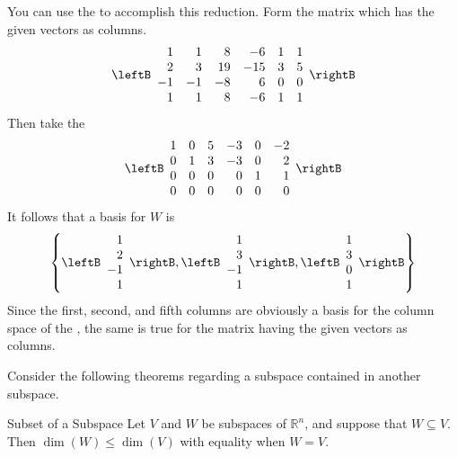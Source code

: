 \begin{solution}
You can use the \rref\; to accomplish this reduction. Form
the matrix which has the given vectors as columns. 
\begin{equation*}
\leftB
\begin{array}{rrrrrr}
1 & 1 & 8 & -6 & 1 & 1 \\ 
2 & 3 & 19 & -15 & 3 & 5 \\ 
-1 & -1 & -8 & 6 & 0 & 0 \\ 
1 & 1 & 8 & -6 & 1 & 1
\end{array}
\rightB
\end{equation*}
Then take the \rref\; 
\begin{equation*}
\leftB
\begin{array}{rrrrrr}
1 & 0 & 5 & -3 & 0 & -2 \\ 
0 & 1 & 3 & -3 & 0 & 2 \\ 
0 & 0 & 0 & 0 & 1 & 1 \\ 
0 & 0 & 0 & 0 & 0 & 0
\end{array}
\rightB
\end{equation*}
It follows that a basis for $W$ is 
\begin{equation*}
\left\{ \leftB 
\begin{array}{r}
1 \\ 
2 \\ 
-1 \\ 
1
\end{array}
\rightB ,\leftB 
\begin{array}{r}
1 \\ 
3 \\ 
-1 \\ 
1
\end{array}
\rightB ,\leftB 
\begin{array}{c}
1 \\ 
3 \\ 
0 \\ 
1
\end{array}
\rightB \right\}
\end{equation*}
Since the first, second, and fifth columns are
obviously a basis for the column space of the \rref, the same
is true for the matrix having the given vectors as columns. 
\end{solution}

Consider the following theorems regarding a subspace contained in another subspace. 

\begin{theorem}{Subset of a Subspace}\label{thm:subsetdimension}
Let $V$ and $W$ be subspaces of $\mathbb{R}^n$, and suppose that $W\subseteq V$.
Then  $\dim(W) \leq \dim(V)$ with equality when $W=V$.
\end{theorem}

